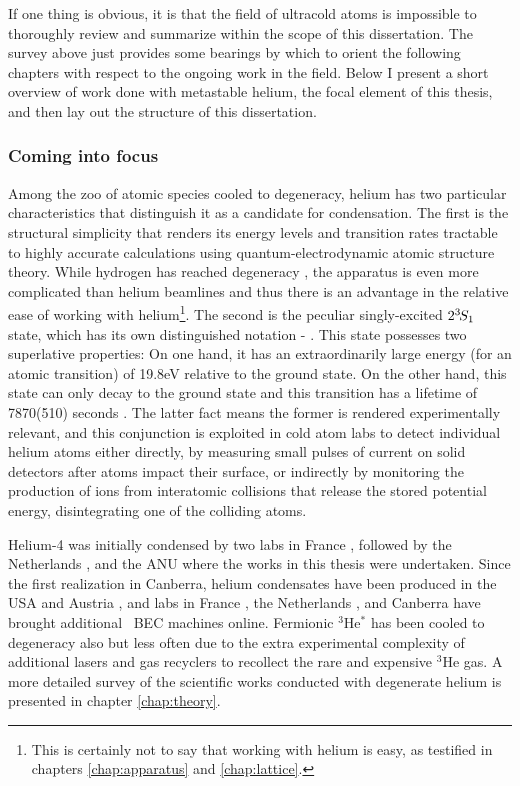 	If one thing is obvious, it is that the field of ultracold atoms is impossible to thoroughly review and summarize within the scope of this dissertation. The survey above just provides some bearings by which to orient the following chapters with respect to the ongoing work in the field. Below I present a short overview of work done with metastable helium, the focal element of this thesis, and then lay out the structure of this dissertation.

		
\subsubsection*{Coming into focus} %

	
		
	Among the zoo of atomic species cooled to degeneracy, helium has two particular characteristics that distinguish it as a candidate for condensation. The first is the structural simplicity that renders its energy levels and transition rates tractable to highly accurate calculations using quantum-electrodynamic atomic structure theory. While hydrogen has reached degeneracy \cite{Fried98}, the apparatus is even more complicated than helium beamlines and thus there is an advantage in the relative ease of working with helium\footnote{This is certainly not to say that working with helium is easy, as testified in chapters \ref{chap:apparatus} and \ref{chap:lattice}.}.
	The second is the peculiar singly-excited $2^{3\!} S_1$ state, which has its own distinguished notation - \mhe. 
	This state possesses two superlative properties: On one hand, it has an extraordinarily large energy (for an atomic transition) of 19.8eV relative to the ground state. 
	On the other hand, this state can only decay to the ground state and this transition has a lifetime of 7870(510) seconds \cite{Hodgman09_mhe}. 
	The latter fact means the former is rendered experimentally relevant, and this conjunction is exploited in cold atom labs to detect individual helium atoms either directly, by measuring small pulses of current on solid detectors after atoms impact their surface, or indirectly by monitoring the production of ions from interatomic collisions that release the stored potential energy, disintegrating one of the colliding atoms. 

	Helium-4 was initially condensed by two labs in France \cite{Robert01,Santos01}, followed by the Netherlands \cite{Tychkov06}, and the ANU \cite{Dall07} where the works in this thesis were undertaken. Since the first realization in Canberra, helium condensates have been produced in the USA \cite{Doret09} and Austria \cite{Keller14}, and labs in France \cite{Bouton15}, the Netherlands \cite{Flores15}, and Canberra \cite{Abbas21} have brought additional \mhe~BEC machines online.
	Fermionic $^3$He$^*$ has been cooled to degeneracy also but less often due to the extra experimental complexity of additional lasers and gas recyclers to recollect the rare and expensive $^3$He gas.
	A more detailed survey of the scientific works conducted with degenerate helium is presented in chapter \ref{chap:theory}. 

